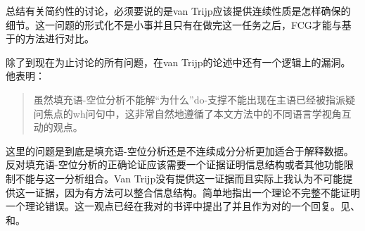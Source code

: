 总结有关简约性的讨论，必须要说的是van Trijp应该提供连续性质是怎样确保的细节。这一问题的形式化不是小事并且只有在做完这一任务之后，FCG才能与基于\slaschc 的方法进行对比。

除了到现在为止讨论的所有问题，在van Trijp的论述中还有一个逻辑上的漏洞。他表明：
\begin{quote}
虽然填充语-空位分析不能解“为什么”do-支撑不能出现在主语已经被指派疑问焦点的wh问句中，这非常自然地遵循了本文方法中的不同语言学视角互动的观点。\citep[]{vanTrijp2014a}
\end{quote}
这里的问题是到底是填充语-空位分析还是不连续成分分析更加适合于解释数据。反对填充语-空位分析的正确论证应该需要一个证据证明信息结构或者其他功能限制不能与这一分析组合。Van Trijp没有提供这一证据而且实际上我认为不可能提供这一证据，因为有方法可以整合信息结构。简单地指出一个理论不完整不能证明一个理论错误。这一观点已经在我对的书评中提出了并且作为对\citet{Boas2014a}的一个回复。见、和。

